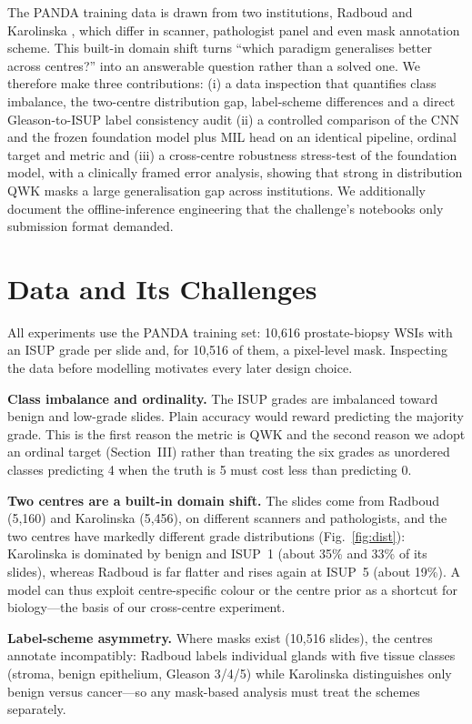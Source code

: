 \documentclass[conference]{IEEEtran}
\begin{document}
The PANDA training data is drawn from two institutions, Radboud and Karolinska
\cite{strom}, which differ in scanner, pathologist panel and even mask annotation
scheme. This built-in domain shift turns ``which paradigm generalises better
across centres?'' into an answerable question rather than a solved one. We
therefore make three contributions: (i) a data inspection that quantifies class
imbalance, the two-centre distribution gap, label-scheme differences and a direct
Gleason-to-ISUP label consistency audit (ii) a controlled comparison of the CNN
and the frozen foundation model plus MIL head on an identical pipeline, ordinal
target and metric and (iii) a cross-centre robustness stress-test of the
foundation model, with a clinically framed error analysis, showing that strong
in distribution QWK masks a large generalisation gap across institutions. We
additionally document the offline-inference engineering that the challenge's
notebooks only submission format demanded.

\section{Data and Its Challenges}

All experiments use the PANDA training set: 10{,}616 prostate-biopsy WSIs with an
ISUP grade per slide and, for 10{,}516 of them, a pixel-level mask. Inspecting the
data before modelling motivates every later design choice.

\textbf{Class imbalance and ordinality.} The ISUP grades are imbalanced toward
benign and low-grade slides. Plain accuracy would reward predicting the majority
grade. This is the first reason the metric is QWK and the second reason we adopt
an ordinal target (Section~III) rather than treating the six grades as unordered
classes predicting 4 when the truth is 5 must cost less than predicting 0.

\textbf{Two centres are a built-in domain shift.} The slides come from Radboud
(5{,}160) and Karolinska (5{,}456), on different scanners and pathologists, and
the two centres have markedly different grade distributions (Fig.~\ref{fig:dist}):
Karolinska is dominated by benign and ISUP~1 (about 35\% and 33\% of its slides),
whereas Radboud is far flatter and rises again at ISUP~5 (about 19\%). A model can
thus exploit centre-specific colour or the centre prior as a shortcut for
biology---the basis of our cross-centre experiment.

\textbf{Label-scheme asymmetry.} Where masks exist (10{,}516 slides), the centres
annotate incompatibly: Radboud labels individual glands with five tissue classes
(stroma, benign epithelium, Gleason 3/4/5) while Karolinska distinguishes only
benign versus cancer---so any mask-based analysis must treat the schemes separately.
\end{document}
